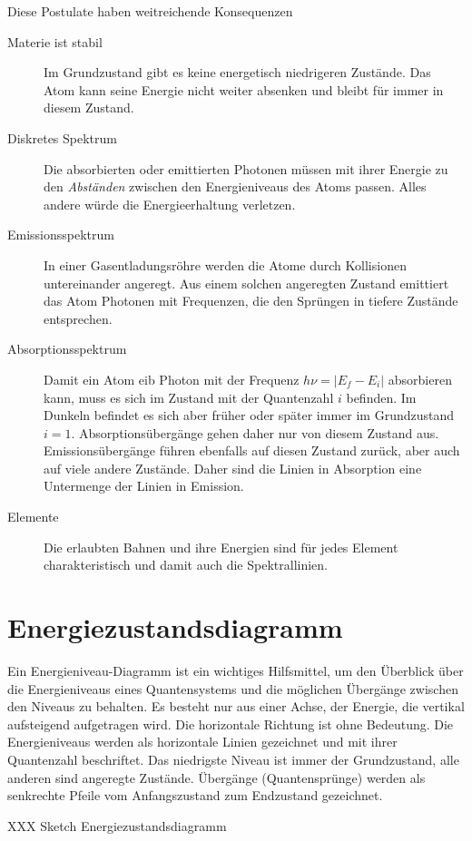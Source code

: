 Diese Postulate haben weitreichende Konsequenzen
\begin{description}
    \item[Materie ist stabil] Im Grundzustand gibt es keine energetisch niedrigeren Zustände. Das Atom kann seine Energie nicht weiter absenken und bleibt für immer in diesem Zustand.
    \item[Diskretes Spektrum] Die absorbierten oder emittierten Photonen müssen mit ihrer Energie zu den \emph{Abständen} zwischen den Energieniveaus des Atoms passen. Alles andere würde die Energieerhaltung verletzen.
    \item[Emissionsspektrum] In einer Gasentladungsröhre werden die Atome durch Kollisionen untereinander angeregt. Aus einem solchen  angeregten Zustand emittiert das Atom Photonen mit Frequenzen, die den Sprüngen in tiefere Zustände entsprechen.
    \item[Absorptionsspektrum] Damit ein Atom eib Photon mit der Frequenz $ h \nu = | E_f - E_i |$ absorbieren kann, muss es sich im Zustand mit der Quantenzahl $i$ befinden. Im Dunkeln befindet es sich aber früher oder später immer im Grundzustand $i=1$. Absorptionsübergänge gehen daher nur von diesem Zustand aus. Emissionsübergänge führen ebenfalls auf diesen Zustand zurück, aber auch auf viele andere Zustände. Daher sind die Linien in Absorption eine Untermenge der Linien in Emission.
    \item[Elemente] Die erlaubten Bahnen und ihre Energien sind für jedes Element charakteristisch und damit auch die Spektrallinien. 
\end{description}


\section{Energiezustandsdiagramm}

Ein Energieniveau-Diagramm ist ein wichtiges Hilfsmittel, um den Überblick über die Energieniveaus eines Quantensystems und die möglichen Übergänge zwischen den Niveaus zu behalten. Es besteht nur aus einer Achse, der Energie, die vertikal aufsteigend aufgetragen wird. Die horizontale Richtung ist ohne Bedeutung. Die Energieniveaus werden als horizontale Linien gezeichnet und mit ihrer Quantenzahl beschriftet. Das niedrigste Niveau ist immer der Grundzustand, alle anderen sind angeregte Zustände. Übergänge (Quantensprünge) werden als senkrechte Pfeile vom Anfangszustand zum Endzustand gezeichnet.


\begin{marginfigure}
    \caption{XXX Sketch Energiezustandsdiagramm}
 \end{marginfigure}


